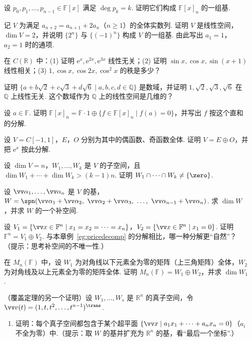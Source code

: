 {		\Bgroup
		\begin{exB}
			\item\label{ex:lmap:B1} 设 $p_0,p_1,\ldots,p_{n-1}\in\mathbb{F}[x]$ 满足 $\deg p_k=k$. 证明它们构成 $\mathbb{F}[x]_n$ 的一组基.
			\item\label{ex:lmap:B2} 记 $V$ 为满足 $a_{n+2}=a_{n+1}+2a_n$（$n\ge1$）的全体实数列. 证明 $V$ 是线性空间，$\dim V=2$，并说明 $\{2^n\}$ 与 $\{(-1)^n\}$ 构成 $V$ 的一组基. 由此写出 $a_1=1$，$a_2=1$ 时的通项.
			\item\label{ex:lmap:B3} 在 $C(\mathbb{R})$ 中：(1) 证明 $\mathrm e^x,\mathrm e^{2x},\mathrm e^{3x}$ 线性无关；(2) 证明 $\sin x,\cos x,\sin(x+1)$ 线性相关；(3) $1,\cos x,\cos2x,\cos^2x$ 的秩是多少？
			\item\label{ex:lmap:B4} 证明 $\{a+b\sqrt2+c\sqrt3+d\sqrt6\mid a,b,c,d\in\mathbb{Q}\}$ 是数域，并证明 $1,\sqrt2,\sqrt3,\sqrt6$ 在 $\mathbb{Q}$ 上线性无关. 这个数域作为 $\mathbb{Q}$ 上的线性空间是几维的？
			\item\label{ex:lmap:B5} 设 $a\in\mathbb{F}$. 证明 $\mathbb{F}[x]_n=\mathbb{F}\cdot1\oplus\{f\in\mathbb{F}[x]_n\mid f(a)=0\}$，并写出 $f$ 按这个直和的分解.
			\item\label{ex:lmap:B6} 设 $V=C[-1,1]$，$E$，$O$ 分别为其中的偶函数、奇函数全体. 证明 $V=E\oplus O$，并把 $\mathrm e^x$ 按此分解.
			\item\label{ex:lmap:B7} 设 $\dim V=n$，$W_1,\ldots,W_k$ 是 $V$ 的子空间，且 $\dim W_1+\cdots+\dim W_k>(k-1)n$. 证明 $W_1\cap\cdots\cap W_k\ne\{\zero\}$.
			\item\label{ex:lmap:B8} 设 $\vv\alpha_1,\ldots,\vv\alpha_n$ 是 $V$ 的基，$W=\spn(\vv\alpha_1+\vv\alpha_2,\ \vv\alpha_2+\vv\alpha_3,\ \ldots,\ \vv\alpha_{n-1}+\vv\alpha_n)$. 求 $\dim W$，并求 $W$ 的一个补空间.
			\item\label{ex:lmap:B9} 设 $V_1=\{\vv x\in\mathbb{F}^n\mid x_1=x_2=\cdots=x_n\}$，$V_2=\{\vv x\in\mathbb{F}^n\mid x_1=0\}$. 证明 $\mathbb{F}^n=V_1\oplus V_2$. 与本章例~\ref{eg:pricedecomp} 的分解相比，哪一种分解更“自然”？（提示：思考补空间的不唯一性.）
			\item\label{ex:lmap:B10} 在 $M_n(\mathbb{F})$ 中，设 $W_1$ 为对角线以下元素全为零的矩阵（上三角矩阵）全体，$W_2$ 为对角线及以上元素全为零的矩阵全体. 证明 $M_n(\mathbb{F})=W_1\oplus W_2$，并求 $\dim W_1$.
			\item\label{ex:lmap:B11} （覆盖定理的另一个证明）设 $W_1,\ldots,W_s$ 是 $\mathbb{R}^n$ 的真子空间，令 $\vv v(t)=(1,t,t^2,\ldots,t^{n-1})^\trans$.
			\begin{enumerate}
				\item 证明：每个真子空间都包含于某个超平面 $\{\vv x\mid a_1x_1+\cdots+a_nx_n=0\}$（$a_i$ 不全为零）中.（提示：取 $W$ 的基并扩充为 $\mathbb{R}^n$ 的基，看“最后一个坐标”.）

\end{enumerate}
\end{exB}}

